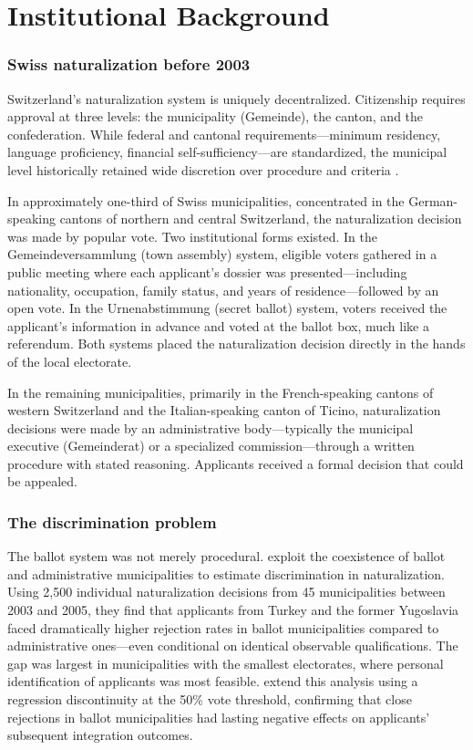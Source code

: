 \documentclass[12pt]{article}
\begin{document}
\section{Institutional Background}\label{sec:background}

\subsubsection*{Swiss naturalization before 2003} Switzerland's naturalization system is uniquely decentralized. Citizenship requires approval at three levels: the municipality (Gemeinde), the canton, and the confederation. While federal and cantonal requirements---minimum residency, language proficiency, financial self-sufficiency---are standardized, the municipal level historically retained wide discretion over procedure and criteria \citep{helbling2008, vatter2018}.

In approximately one-third of Swiss municipalities, concentrated in the German-speaking cantons of northern and central Switzerland, the naturalization decision was made by popular vote. Two institutional forms existed. In the Gemeindeversammlung (town assembly) system, eligible voters gathered in a public meeting where each applicant's dossier was presented---including nationality, occupation, family status, and years of residence---followed by an open vote. In the Urnenabstimmung (secret ballot) system, voters received the applicant's information in advance and voted at the ballot box, much like a referendum. Both systems placed the naturalization decision directly in the hands of the local electorate.

In the remaining municipalities, primarily in the French-speaking cantons of western Switzerland and the Italian-speaking canton of Ticino, naturalization decisions were made by an administrative body---typically the municipal executive (Gemeinderat) or a specialized commission---through a written procedure with stated reasoning. Applicants received a formal decision that could be appealed.

\subsubsection*{The discrimination problem} The ballot system was not merely procedural. \citet{hainmueller2013} exploit the coexistence of ballot and administrative municipalities to estimate discrimination in naturalization. Using 2,500 individual naturalization decisions from 45 municipalities between 2003 and 2005, they find that applicants from Turkey and the former Yugoslavia faced dramatically higher rejection rates in ballot municipalities compared to administrative ones---even conditional on identical observable qualifications. The gap was largest in municipalities with the smallest electorates, where personal identification of applicants was most feasible. \citet{hainmueller2015} extend this analysis using a regression discontinuity at the 50\% vote threshold, confirming that close rejections in ballot municipalities had lasting negative effects on applicants' subsequent integration outcomes.
\end{document}
